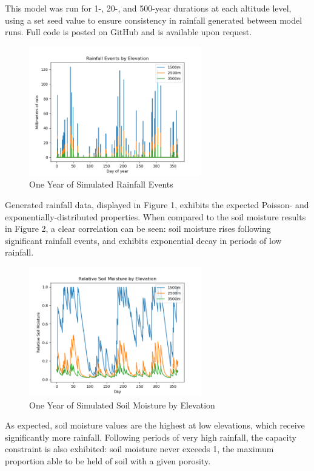 \documentclass[12pt, letterpaper]{article}
\begin{document}
This model was run for 1-, 20-, and 500-year durations at each altitude level, using a set seed value to ensure consistency in rainfall generated between model runs. Full code is posted on GitHub and is available upon request.

\begin{figure}[hp]
    \centering
    \includegraphics[width=0.67\textwidth]{rainoneyear.png}
    \caption{One Year of Simulated Rainfall Events}
    \label{fig:my_label}
\end{figure}

Generated rainfall data, displayed in Figure 1, exhibits the expected Poisson- and exponentially-distributed properties. When compared to the soil moisture results in Figure 2, a clear correlation can be seen: soil moisture rises following significant rainfall events, and exhibits exponential decay in periods of low rainfall.

\begin{figure}[hp]
    \centering
    \includegraphics[width=0.67\textwidth]{soilmoistureoneyear.png}
    \caption{One Year of Simulated Soil Moisture by Elevation}
    \label{fig:my_label}
\end{figure}

As expected, soil moisture values are the highest at low elevations, which receive significantly more rainfall. Following periods of very high rainfall, the capacity constraint is also exhibited: soil moisture never exceeds 1, the maximum proportion able to be held of soil with a given porosity.
\end{document}

